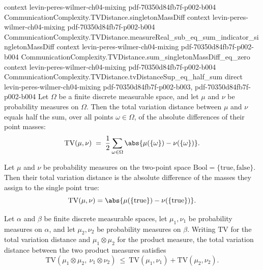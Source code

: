 \begin{theorem}
  {context}
  {levin-peres-wilmer-ch04-mixing}
  {pdf-70350d84fb7f-p002-b004}
\proofstep
  {CommunicationComplexity.TVDistance.singletonMassDiff}
  {context}
  {levin-peres-wilmer-ch04-mixing}
  {pdf-70350d84fb7f-p002-b004}
\proofstep
  {CommunicationComplexity.TVDistance.measureReal_sub_eq_sum_indicator_singletonMassDiff}
  {context}
  {levin-peres-wilmer-ch04-mixing}
  {pdf-70350d84fb7f-p002-b004}
\proofstep
  {CommunicationComplexity.TVDistance.sum_singletonMassDiff_eq_zero}
  {context}
  {levin-peres-wilmer-ch04-mixing}
  {pdf-70350d84fb7f-p002-b004}
\proofstep
  {CommunicationComplexity.TVDistance.tvDistanceSup_eq_half_sum}
  {direct}
  {levin-peres-wilmer-ch04-mixing}
  {pdf-70350d84fb7f-p002-b003,
    pdf-70350d84fb7f-p002-b004}
Let $\Omega$ be a finite discrete measurable space, and let $\mu$ and $\nu$ be
probability measures on $\Omega$. Then the total variation distance between $\mu$ and
$\nu$ equals half the sum, over all points $\omega \in \Omega$, of the absolute
differences of their point masses:
\[
  \mathrm{TV}(\mu,\nu) \;=\; \frac{1}{2}\sum_{\omega \in \Omega}
    \abs{\mu(\{\omega\}) - \nu(\{\omega\})}.
\]
\end{theorem}

\begin{theorem}
\label{CommunicationComplexity.TVDistance.tvDistance_bool_eq_abs_true}
\leanok
{}
Let $\mu$ and $\nu$ be probability measures on the two-point space $\mathrm{Bool} =
\{\mathrm{true}, \mathrm{false}\}$. Then their total variation distance is the absolute
difference of the masses they assign to the single point $\mathrm{true}$:
\[
\mathrm{TV}(\mu,\nu) = \abs{\mu(\{\mathrm{true}\}) - \nu(\{\mathrm{true}\})}.
\]
\end{theorem}

\begin{theorem}
\label{CommunicationComplexity.TVDistance.tvDistance_prod_le}
\leanok
{}
Let $\alpha$ and $\beta$ be finite discrete measurable spaces, let $\mu_1,\nu_1$ be
probability measures on $\alpha$, and let $\mu_2,\nu_2$ be probability measures on
$\beta$. Writing $\mathrm{TV}$ for the total variation distance and $\mu_1\otimes\mu_2$
for the product measure, the total variation distance between the two product measures
satisfies
\[
\mathrm{TV}(\mu_1\otimes\mu_2,\ \nu_1\otimes\nu_2)\ \le\
\mathrm{TV}(\mu_1,\nu_1)+\mathrm{TV}(\mu_2,\nu_2).
\]
\end{theorem}

